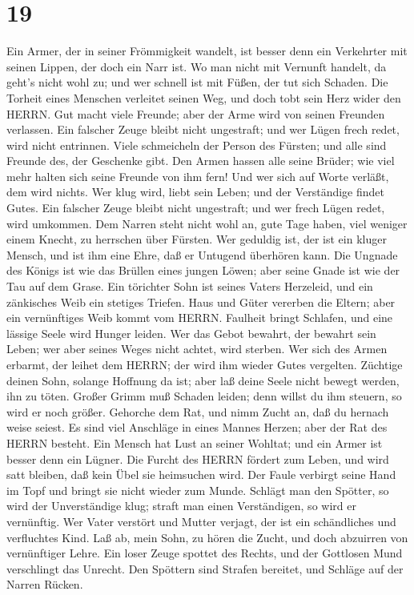 \hypertarget{section-18}{%
\section{19}\label{section-18}}

 Ein Armer, der in seiner Frömmigkeit wandelt, ist besser
denn ein Verkehrter mit seinen Lippen, der doch ein Narr ist.
 Wo man nicht mit Vernunft handelt, da geht's nicht wohl zu;
und wer schnell ist mit Füßen, der tut sich Schaden.  Die
Torheit eines Menschen verleitet seinen Weg, und doch tobt sein Herz
wider den HERRN.  Gut macht viele Freunde; aber der Arme
wird von seinen Freunden verlassen.  Ein falscher Zeuge
bleibt nicht ungestraft; und wer Lügen frech redet, wird nicht
entrinnen.  Viele schmeicheln der Person des Fürsten; und
alle sind Freunde des, der Geschenke gibt.  Den Armen hassen
alle seine Brüder; wie viel mehr halten sich seine Freunde von ihm fern!
Und wer sich auf Worte verläßt, dem wird nichts.  Wer klug
wird, liebt sein Leben; und der Verständige findet Gutes. 
Ein falscher Zeuge bleibt nicht ungestraft; und wer frech Lügen redet,
wird umkommen.  Dem Narren steht nicht wohl an, gute Tage
haben, viel weniger einem Knecht, zu herrschen über Fürsten.
 Wer geduldig ist, der ist ein kluger Mensch, und ist ihm
eine Ehre, daß er Untugend überhören kann.  Die Ungnade des
Königs ist wie das Brüllen eines jungen Löwen; aber seine Gnade ist wie
der Tau auf dem Grase.  Ein törichter Sohn ist seines
Vaters Herzeleid, und ein zänkisches Weib ein stetiges Triefen.
 Haus und Güter vererben die Eltern; aber ein vernünftiges
Weib kommt vom HERRN.  Faulheit bringt Schlafen, und eine
lässige Seele wird Hunger leiden.  Wer das Gebot bewahrt,
der bewahrt sein Leben; wer aber seines Weges nicht achtet, wird
sterben.  Wer sich des Armen erbarmt, der leihet dem HERRN;
der wird ihm wieder Gutes vergelten.  Züchtige deinen Sohn,
solange Hoffnung da ist; aber laß deine Seele nicht bewegt werden, ihn
zu töten.  Großer Grimm muß Schaden leiden; denn willst du
ihm steuern, so wird er noch größer.  Gehorche dem Rat, und
nimm Zucht an, daß du hernach weise seiest.  Es sind viel
Anschläge in eines Mannes Herzen; aber der Rat des HERRN besteht.
 Ein Mensch hat Lust an seiner Wohltat; und ein Armer ist
besser denn ein Lügner.  Die Furcht des HERRN fördert zum
Leben, und wird satt bleiben, daß kein Übel sie heimsuchen wird.
 Der Faule verbirgt seine Hand im Topf und bringt sie nicht
wieder zum Munde.  Schlägt man den Spötter, so wird der
Unverständige klug; straft man einen Verständigen, so wird er
vernünftig.  Wer Vater verstört und Mutter verjagt, der ist
ein schändliches und verfluchtes Kind.  Laß ab, mein Sohn,
zu hören die Zucht, und doch abzuirren von vernünftiger Lehre.
 Ein loser Zeuge spottet des Rechts, und der Gottlosen Mund
verschlingt das Unrecht.  Den Spöttern sind Strafen
bereitet, und Schläge auf der Narren Rücken.

